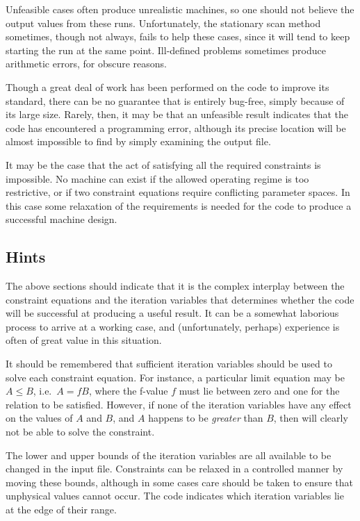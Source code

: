 Unfeasible cases often produce unrealistic machines, so one should not believe
the output values from these runs. Unfortunately, the stationary scan method
sometimes, though not always, fails to help these cases, since it will tend to
keep starting the run at the same point. Ill-defined problems sometimes
produce arithmetic errors, for obscure reasons.

Though a great deal of work has been performed on the code to improve its
standard, there can be no guarantee that \PS is entirely bug-free, simply
because of its large size. Rarely, then, it may be that an unfeasible result
indicates that the code has encountered a programming error, although its
precise location will be almost impossible to find by simply examining the
output file.

It may be the case that the act of satisfying all the required constraints is
impossible. No machine can exist if the allowed operating regime is too
restrictive, or if two constraint equations require conflicting parameter
spaces. In this case some relaxation of the requirements is needed for the
code to produce a successful machine design.

\subsection{Hints}

The above sections should indicate that it is the complex interplay between
the constraint equations and the iteration variables that determines whether
the code will be successful at producing a useful result. It can be a somewhat
laborious process to arrive at a working case, and (unfortunately, perhaps)
experience is often of great value in this situation.

It should be remembered that sufficient iteration variables should be used to
solve each constraint equation. For instance, a particular limit equation may
be $A \leq B$, i.e.\ $A = fB$, where the f-value $f$ must lie between zero and
one for the relation to be satisfied.  However, if none of the iteration
variables have any effect on the values of $A$ and $B$, and $A$ happens to be
{\em greater}\/ than $B$, then \PS will clearly not be able to solve the
constraint.

The lower and upper bounds of the iteration variables are all available to be
changed in the input file. Constraints can be relaxed in a controlled manner
by moving these bounds, although in some cases care should be taken to ensure
that unphysical values cannot occur.  The code indicates which iteration
variables lie at the edge of their range.

